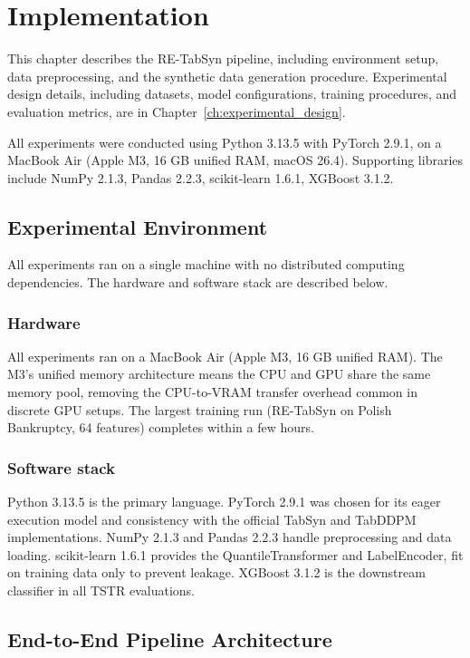 \chapter{Implementation}

This chapter describes the RE-TabSyn pipeline, including environment setup, data preprocessing, and the synthetic data generation procedure. Experimental design details, including datasets, model configurations, training procedures, and evaluation metrics, are in Chapter~\ref{ch:experimental_design}.

All experiments were conducted using Python 3.13.5 with PyTorch 2.9.1, on a MacBook Air (Apple M3, 16 GB unified RAM, macOS 26.4). Supporting libraries include NumPy 2.1.3, Pandas 2.2.3, scikit-learn 1.6.1, XGBoost 3.1.2.

\section{Experimental Environment}

All experiments ran on a single machine with no distributed computing dependencies. The hardware and software stack are described below.

\subsection{Hardware}

All experiments ran on a MacBook Air (Apple M3, 16 GB unified RAM). The M3's unified memory architecture means the CPU and GPU share the same memory pool, removing the CPU-to-VRAM transfer overhead common in discrete GPU setups. The largest training run (RE-TabSyn on Polish Bankruptcy, 64 features) completes within a few hours.

\subsection{Software stack}

Python 3.13.5 is the primary language. PyTorch 2.9.1 was chosen for its eager execution model and consistency with the official TabSyn and TabDDPM implementations. NumPy 2.1.3 and Pandas 2.2.3 handle preprocessing and data loading. scikit-learn 1.6.1 provides the QuantileTransformer and LabelEncoder, fit on training data only to prevent leakage. XGBoost 3.1.2 \cite{chen2016xgboost} is the downstream classifier in all TSTR evaluations.

\section{End-to-End Pipeline Architecture}

